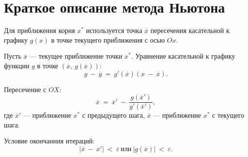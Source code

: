 \documentclass{bmstu}
\begin{document}
\clearpage
\section{Краткое описание метода Ньютона}

Для приближения корня $x^*$ используется точка $\overline{x}$ пересечения касательной к графику $g(x)$ в точке текущего приближения с осью $Ox$.

Пусть $\overline{x}$ --- текущее приближение точки $x^*$. Уравнение касательной к графику функции $g$ в точке $(\overline{x}, \ g(\overline{x}))$:
\begin{equation}
    y \ - \ \overline{y} \ = \ g'(\overline{x})(x \ - \ \overline{x}).
\end{equation}

Пересечение с $OX$:
\begin{equation}
    \overline{x} \ = \ \overline{x}' \ - \ \frac{g(\overline{x}')}{g'(\overline{x}')},
\end{equation}
где $\overline{x}'$ --- приближение $x^*$ с предыдущего шага, $\overline{x}$ --- приближение $x^*$ с текущего шага.

Условие окончанния итераций:
\begin{equation}
    |\overline{x} \ - \ \overline{x}'| \ < \ \varepsilon \ \text{или} \ |g(\overline{x})| \ < \ \varepsilon.
\end{equation}
\end{document}

